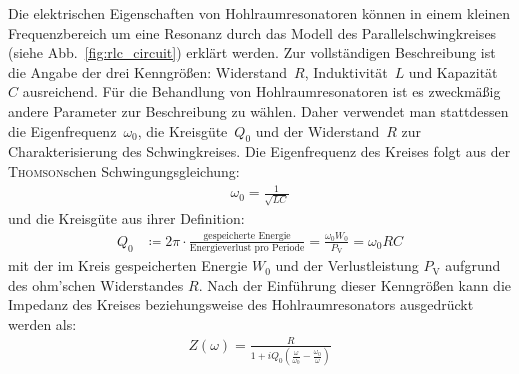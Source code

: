 Die elektrischen Eigenschaften von Hohlraumresonatoren können in einem kleinen Frequenzbereich um eine Resonanz durch das Modell des Parallelschwingkreises (siehe Abb.\ \ref{fig:rlc_circuit}) erklärt werden.
Zur vollständigen Beschreibung ist die Angabe der drei Kenngrößen: Widerstand~$R$, Induktivität~$L$ und Kapazität~$C$ ausreichend.
Für die Behandlung von Hohlraumresonatoren ist es zweckmäßig andere Parameter zur Beschreibung zu wählen.
Daher verwendet man stattdessen die Eigenfrequenz~$\omega_0$, die Kreisgüte~$Q_0$ und der Widerstand~$R$ zur Charakterisierung des Schwingkreises.
Die Eigenfrequenz des Kreises folgt aus der \textsc{Thomson}schen Schwingungsgleichung:
\begin{align}
  \omega_0 = \frac{1}{\sqrt{L C}}
\end{align}
und die Kreisgüte aus ihrer Definition:
\begin{align}
  Q_0 &\coloneqq 2\pi \cdot \frac{\text{gespeicherte Energie}}{\text{Energieverlust pro Periode}} = \frac{\omega_0 W_0}{P_\mathrm{V}} = \omega_0 R C
  \label{eq:def_guete}
\end{align}
mit der im Kreis gespeicherten Energie $W_0$ und der Verlustleistung $P_\mathrm{V}$ aufgrund des ohm'schen Widerstandes $R$.
Nach der Einführung dieser Kenngrößen kann die Impedanz des Kreises beziehungsweise des Hohlraumresonators ausgedrückt werden als:
\begin{align}
  Z(\omega) = \frac{R}{1 + i Q_0 \left( \frac{\omega}{\omega_0}  - \frac{\omega_0}{\omega}\right)}
\end{align}

